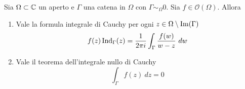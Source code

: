 \begin{theorem}
Sia $\Omega \subset \mathbb{C}$ un aperto e $\Gamma$ una catena in $\Omega$ con
$\Gamma \sim_\Omega 0$. Sia $f \in \mathcal{O}(\Omega)$. Allora 
\begin{enumerate}
    \item Vale la formula integrale di Cauchy per ogni $z \in \Omega \setminus
        \operatorname{Im}(\Gamma)$  
        \begin{equation*}
            f(z) \operatorname{Ind}_\Gamma(z) = \frac{1}{2\pi i} \int_\Gamma
            \frac{f(w)}{w-z}\ dw
        \end{equation*}
    \item Vale il teorema dell'integrale nullo di Cauchy 
        \begin{equation*}
            \int_\Gamma f(z) \ dz = 0
        \end{equation*}
\end{enumerate}
\label{thr:formule-di-cauchy-generale}
\end{theorem}
